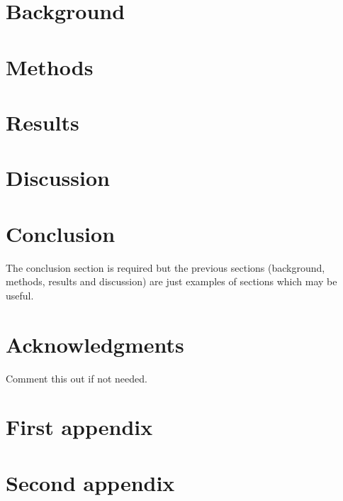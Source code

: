 \documentclass[a4paper,11pt, titlepage]{article}
\theoremstyle{definition}
\theoremstyle{plain}
\theoremstyle{remark}
\begin{document}
\section{Background}

\section{Methods}

\section{Results}

\section{Discussion}

\section{Conclusion}
The conclusion section is required but the previous sections (background, methods, results and discussion) are just examples of sections which may be useful. 


\section*{Acknowledgments}
Comment this out if not needed.

\appendix

\section{First appendix}
\label{sec:appendix1}

\section{Second appendix}
\label{sec:appendix2}



\end{document}
